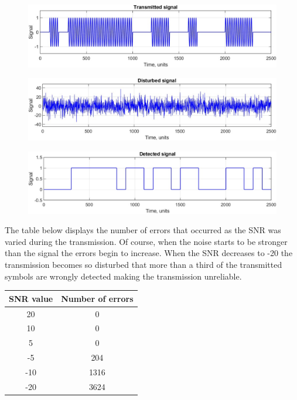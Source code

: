 \begin{figure}[h!]
    \centering
    \includegraphics[width = .85\textwidth]{lab-2/imgs/task8.6_Transmitted.jpg}
\end{figure}
\vspace{-15px}
\begin{figure}[h!]
    \centering
    \includegraphics[width = .85\textwidth]{lab-2/imgs/task8.6_Noise.jpg}
\end{figure}
\vspace{-15px}
\begin{figure}[h!]
    \centering
    \includegraphics[width = .85\textwidth]{lab-2/imgs/task8.6_Detected_Error.jpg}
\end{figure}

\FloatBarrier\noindent The table below displays the number of errors that occurred as the SNR was varied during the transmission. Of course, when the noise starts to be stronger than the signal the errors begin to increase. When the SNR decreases to -20 the transmission becomes so disturbed that more than a third of the transmitted symbols are wrongly detected making the transmission unreliable. 

\begin{table}[h!]
    \centering
    \begin{tabular}{|c|c|} 
        \hline \textbf{SNR value} & \textbf{Number of errors}  \\\hline\hline
        
         20 & 0 \\
         10 & 0 \\
         5 & 0 \\
         -5 & 204 \\
         -10 & 1316 \\
         -20 & 3624 \\\hline
    \end{tabular}
\end{table}

